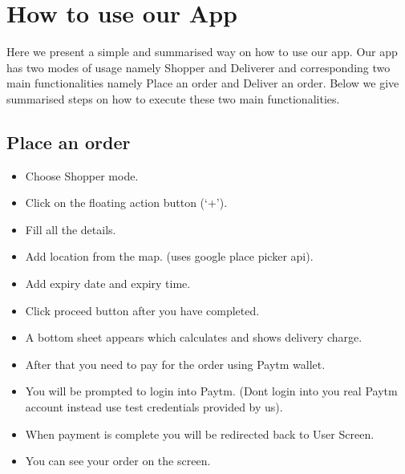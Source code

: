 \documentclass{report}
\begin{document}
\chapter{How to use our App}
Here we present a simple and summarised way on how to use our app.
Our app has two modes of usage namely Shopper and Deliverer and corresponding two main functionalities namely Place an order and Deliver an order.
    Below we give summarised steps on how to execute these two main functionalities.

\section{Place an order}
\begin{itemize}[label=$\rightarrow$]
\item Choose Shopper mode.
\item Click on the floating action button (`+').
\item Fill all the details.
\item Add location from the map. (uses google place picker\cite{c14} api).
\item Add expiry date and expiry time\footnotemark.
\item Click proceed button after you have completed.
\item A bottom sheet appears which calculates and shows delivery charge.
\item After that you need to pay for the order using Paytm wallet\footnotemark.
\item You will be prompted to login into Paytm. (Don\textquotesingle t login into you real Paytm account instead use test credentials provided by us).
\item When payment is complete you will be redirected back to User Screen.
\item You can see your order on the screen.
\end{itemize}
\end{document}
